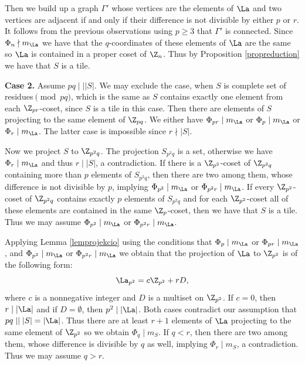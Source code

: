         Then we build up a graph $\Gamma'$ whose vertices are the elements of $\La$ and two vertices are adjacent if and only if their difference is not divisible by either $p$ or $r$. It follows from the previous observations using $p \ge 3$ that $\Gamma'$ is connected. 
        Since $\Phi_n \nmid m_\La$ we have that the $q$-coordinates of these elements of $\La$ are the same so $\La$ is contained in a proper coset of $\Z_n$. Thus by Proposition \ref{propreduction} we have that $S$ is a tile. 
        
        {\bf Case 2.} Assume $pq \mid\mid |S|$.
        We  may exclude the case, when  $S$ is complete set of residues$\pmod{pq}$, which is the same as $S$ contains exactly one element from each $\Z_{pr}$-coset, since $S$ is a tile in this case. Then there are elements of $S$ projecting to the same element of $\Z_{pq}$. We either have $\Phi_{pr} \mid m_{\La}$ or $\Phi_p \mid m_{\La}$ or $\Phi_{r} \mid m_{\La}$.  The latter case is impossible since $r \nmid |S|$.
        
        Now we project $S$ to $\Z_{p^2q}$. The projection $S_{p^2q}$ is a set, otherwise we have $\Phi_r  \mid m_{\La}$ and thus $r \mid |S|$, a contradiction. If there is a $\Z_{p^2}$-coset of $\Z_{p^2q}$ containing more than $p$ elements of $S_{p^2q}$, then there are two among them, whose difference is not divisible by $p$, implying $\Phi_{p^2} \mid m_{\La}$ or $\Phi_{p^2r} \mid m_{\La}$.
        If every $\Z_{p^2}$-coset of $\Z_{p^2q}$ contains exactly $p$ elements of $S_{p^2q}$ and for each $\Z_{p^2}$-coset all of these elements are contained in the same $\Z_p$-coset, then we have that $S$ is a tile. Thus we may assume $\Phi_{p^2} \mid m_{\La}$ or $\Phi_{p^2r} \mid m_{\La}$.
        
        Applying Lemma \ref{lemprojekcio} using the conditions that $\Phi_p \mid m_{\La}$ or $\Phi_{pr} \mid m_{\La}$,   and $\Phi_{p^2} \mid m_{\La}$ or $\Phi_{p^2r} \mid m_{\La}$
        we obtain that the projection of $\La$ to $\Z_{p^2}$ is of the following form: 
        \begin{equation}\label{eqp2}
             \La_{p^2}=c \Z_{p^2}+rD, 
             \end{equation}
        where $c$ is a nonnegative integer and $D$ is a multiset on $\Z_{p^2}$. 
        If $c = 0$, then $r \mid |\La|$ and if $D=\emptyset$, then $p^2 \mid |\La|$. 
        Both cases contradict our assumption that $pq \mid \mid |S|=|\La|$. 
        Thus there are at least $r+1$ elements of $\La$ projecting to the same element of $\Z_{p^2}$ so we obtain $\Phi_q \mid m_S$. If $q <r$, then there are two among them, whose difference is divisible by $q$ as well, implying $\Phi_r \mid m_S$, a contradiction. Thus we may assume $q>r$.  
        
